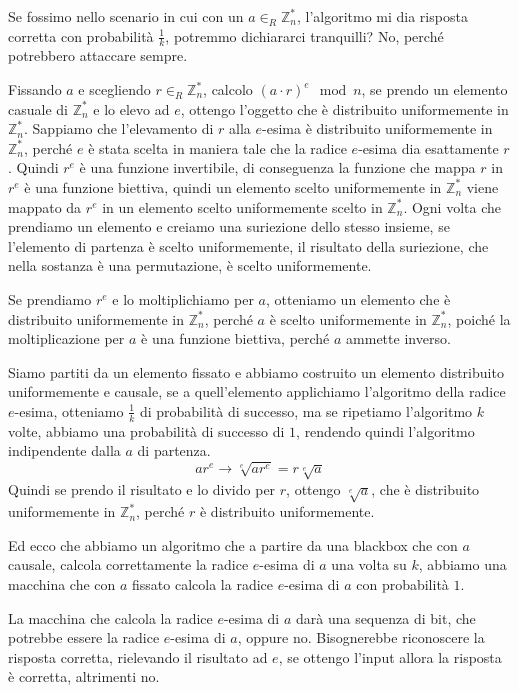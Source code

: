 Se fossimo nello scenario in cui con un $a\in_R \mathbb{Z}_n^*$, l'algoritmo 
mi dia risposta corretta con probabilità $\frac{1}{k}$, potremmo dichiararci 
tranquilli? No, perché potrebbero attaccare sempre.

Fissando $a$ e scegliendo $r \in_R \mathbb{Z}_n^*$, calcolo $(a\cdot r)^e \mod n$,
se prendo un elemento casuale di $\mathbb{Z}_n^*$ e lo elevo ad $e$, ottengo
l'oggetto che è distribuito uniformemente in $\mathbb{Z}_n^*$. Sappiamo che
l'elevamento di $r$ alla $e$-esima è distribuito uniformemente in $\mathbb{Z}_n^*$, 
perché $e$ è stata scelta in maniera tale che la radice $e$-esima dia esattamente 
$r$. Quindi $r^e$ è una funzione invertibile, di conseguenza la funzione che mappa $r$ in 
$r^e$ è una funzione biettiva, quindi un elemento scelto uniformemente in $\mathbb{Z}_n^*$
viene mappato da $r^e$ in un elemento scelto uniformemente scelto in $\mathbb{Z}_n^*$.
Ogni volta che prendiamo un elemento e creiamo una suriezione dello stesso insieme, 
se l'elemento di partenza è scelto uniformemente, il risultato della suriezione, che nella 
sostanza è una permutazione, è scelto uniformemente.

Se prendiamo $r^e$ e lo moltiplichiamo per $a$, otteniamo un elemento che è distribuito
uniformemente in $\mathbb{Z}_n^*$, perché $a$ è scelto uniformemente in $\mathbb{Z}_n^*$, 
poiché la moltiplicazione per $a$ è una funzione biettiva, perché $a$ ammette inverso.

Siamo partiti da un elemento fissato e abbiamo costruito un elemento distribuito uniformemente
e causale, se a quell'elemento applichiamo l'algoritmo della radice $e$-esima, otteniamo
$\frac{1}{k}$ di probabilità di successo, ma se ripetiamo l'algoritmo $k$ volte, abbiamo
una probabilità di successo di $1$, rendendo quindi l'algoritmo indipendente dalla $a$ di 
partenza.
\[
  ar^e \rightarrow \sqrt[e]{ar^e} = r \sqrt[e]{a}
\]
Quindi se prendo il risultato e lo divido per $r$, ottengo $\sqrt[e]{a}$,
che è distribuito uniformemente in $\mathbb{Z}_n^*$, perché $r$ è distribuito uniformemente.

Ed ecco che abbiamo un algoritmo che a partire da una blackbox che con $a$ causale, 
calcola correttamente la radice $e$-esima di $a$ una volta su $k$, abbiamo una macchina 
che con $a$ fissato calcola la radice $e$-esima di $a$ con probabilità $1$.

La macchina che calcola la radice $e$-esima di $a$ darà una sequenza di bit, che
potrebbe essere la radice $e$-esima di $a$, oppure no. Bisognerebbe riconoscere la risposta
corretta, rielevando il risultato ad $e$, se ottengo l'input allora la risposta è 
corretta, altrimenti no.


